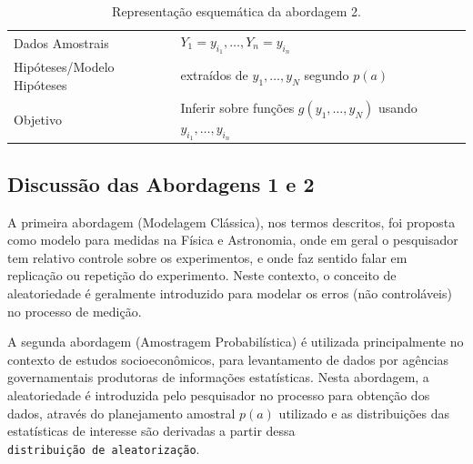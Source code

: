 \documentclass[]{book}
\theoremstyle{definition}
\theoremstyle{definition}
\theoremstyle{definition}
\theoremstyle{remark}
\begin{document}
\begin{longtable}[]{@{}ll@{}}
\caption{\label{tab:modelamo} Representação esquemática da abordagem
2.}\tabularnewline
\toprule
\begin{minipage}[t]{0.29\columnwidth}\raggedright\strut
Dados Amostrais\strut
\end{minipage} & \begin{minipage}[t]{0.60\columnwidth}\raggedright\strut
\(Y_1=y_{i_1}, \ldots, Y_n=y_{i_n}\)\strut
\end{minipage}\tabularnewline
\begin{minipage}[t]{0.29\columnwidth}\raggedright\strut
Hipóteses/Modelo Hipóteses\strut
\end{minipage} & \begin{minipage}[t]{0.60\columnwidth}\raggedright\strut
extraídos de \(y_1, \ldots , y_N\) segundo \(p(a)\)\strut
\end{minipage}\tabularnewline
\begin{minipage}[t]{0.29\columnwidth}\raggedright\strut
Objetivo\strut
\end{minipage} & \begin{minipage}[t]{0.60\columnwidth}\raggedright\strut
Inferir sobre funções \(g(y_1, \ldots , y_N)\) usando
\(y_{i_1}, \ldots, y_{i_n}\)\strut
\end{minipage}\tabularnewline
\bottomrule
\end{longtable}

\subsection{Discussão das Abordagens 1 e
2}\label{discussao-das-abordagens-1-e-2}

A primeira abordagem (Modelagem Clássica), nos termos descritos, foi
proposta como modelo para medidas na Física e Astronomia, onde em geral
o pesquisador tem relativo controle sobre os experimentos, e onde faz
sentido falar em replicação ou repetição do experimento. Neste contexto,
o conceito de aleatoriedade é geralmente introduzido para modelar os
erros (não controláveis) no processo de medição.

A segunda abordagem (Amostragem Probabilística) é utilizada
principalmente no contexto de estudos socioeconômicos, para levantamento
de dados por agências governamentais produtoras de informações
estatísticas. Nesta abordagem, a aleatoriedade é introduzida pelo
pesquisador no processo para obtenção dos dados, através do planejamento
amostral \(p(a)\) utilizado \citep{Neyman} e as distribuições das
estatísticas de interesse são derivadas a partir dessa
\texttt{distribuição\ de\ aleatorização}.
\end{document}
